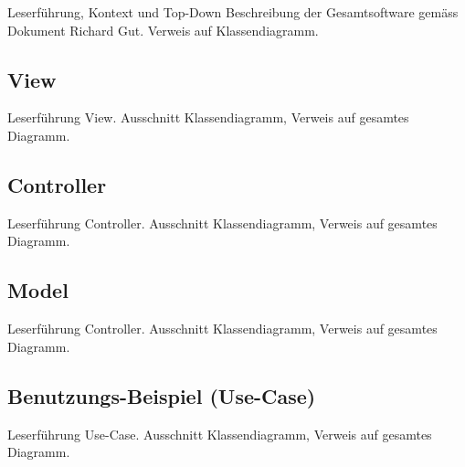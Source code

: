 Leserf\"uhrung, Kontext und Top-Down  Beschreibung der Gesamtsoftware gem\"ass
Dokument Richard Gut. Verweis auf Klassendiagramm.


\subsection{View}

Leserf\"uhrung View.
Ausschnitt Klassendiagramm, Verweis auf gesamtes Diagramm.




\subsection{Controller}

Leserf\"uhrung Controller.
Ausschnitt Klassendiagramm, Verweis auf gesamtes Diagramm.




\subsection{Model}

Leserf\"uhrung Controller.
Ausschnitt Klassendiagramm, Verweis auf gesamtes Diagramm.




\subsection{Benutzungs-Beispiel (Use-Case)}

Leserf\"uhrung Use-Case.
Ausschnitt Klassendiagramm, Verweis auf gesamtes Diagramm.


